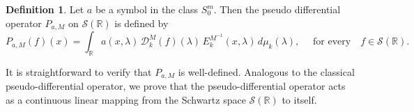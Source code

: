 \documentclass[12pt,a4paper,reqno]{amsproc}
\newtheorem{theorem}{Theorem}[section]
\theoremstyle{definition}
\newtheorem{definition}[theorem]{Definition}
\theoremstyle{remark}
\numberwithin{equation}{section}
\begin{document}
\begin{definition} \label{C7-D3.2}
Let  $a$ be a symbol in the class $S_0^m$. Then the pseudo differential operator $P_{a,M}$ on $ \mathcal{S}(\mathbb{R})$ is defined by
\begin{equation*}
P_{a,M}(f)(x) =  \int_{\mathbb{R}}  a(x,\lambda)\, \mathcal{D}_k^M(f)(\lambda)\, E_k^{M^{-1}}(x,\lambda)\,d\mu_k(\lambda), \quad \text{ for every} \quad f \in \mathcal{S}(\mathbb{R}).
\end{equation*}
\end{definition}
It is straightforward to verify that 
$P_{a,M}$ is well-defined. Analogous to the classical pseudo-differential operator, we prove that the pseudo-differential operator acts as a continuous linear mapping from the Schwartz space $\mathcal{S}(\mathbb{R})$ to itself. 
\end{document}
